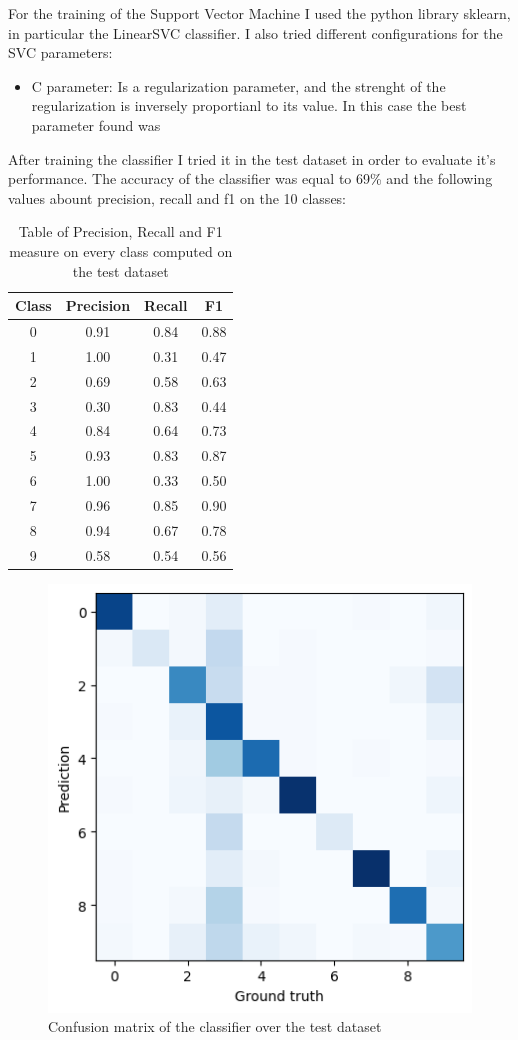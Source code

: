 \documentclass[12pt,journal,compsoc]{IEEEtran}
\begin{document}
For the training of the Support Vector Machine I used the python library sklearn, in particular the LinearSVC classifier. I also tried different configurations for the SVC parameters:
\begin{itemize}
	\item C parameter: Is a regularization parameter, and the strenght of the regularization is inversely proportianl to its value. In this case the best parameter found was 
\end{itemize}
After training the classifier I tried it in the test dataset in order to evaluate it's performance. The accuracy of the classifier was equal to 69\% and the following values abount precision, recall and f1 on the 10 classes:
\begin{table}[ht]
	\centering
	\begin{tabular}{c c c c }
		Class & Precision & Recall & F1  \\
		\hline
		0 & 0.91 &0.84  &0.88        \\
		1 & 1.00 &0.31  &0.47        \\
		2 & 0.69 &0.58  &0.63        \\
		3 & 0.30 &0.83  &0.44        \\ 
		4 & 0.84 &0.64  &0.73        \\
		5 & 0.93 &0.83  &0.87        \\
		6 & 1.00 &0.33  &0.50        \\
		7 & 0.96 &0.85  &0.90        \\
		8 & 0.94 &0.67  &0.78        \\
		9 & 0.58 &0.54  &0.56        \\
	\end{tabular}
	\caption{Table of Precision, Recall and F1 measure on every class computed on the test dataset}
	\end{table}
	\begin{figure}[H]
		\begin{center}
		\includegraphics[scale=.75]{./images/confmat_soundClassification.png}
		\end{center}
		\caption{Confusion matrix of the classifier over the test dataset}
	\end{figure}
\end{document}
